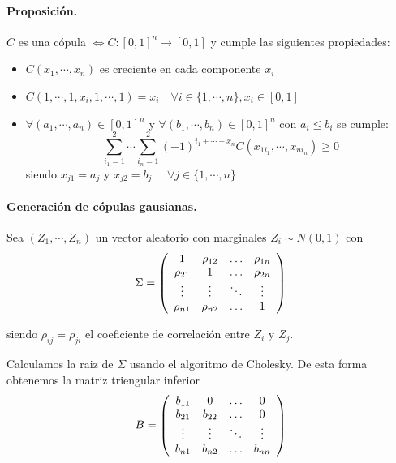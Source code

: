 \paragraph{Proposici\'on.}
$C$ es una c\'opula $\iff C:[0,1]^n \to [0,1]$ y cumple las siguientes 
propiedades:
\begin{itemize}
\item $C(x_1, \cdots, x_n)$ es creciente en cada componente $x_i$
\item $C(1, \cdots, 1, x_i, 1, \cdots, 1) = x_i \quad \forall i \in \{1, \cdots, n\}, x_i \in [0,1]$
\item $\forall (a_1, \cdots, a_n) \in [0,1]^n$ y $\forall (b_1, \cdots, b_n) \in [0,1]^n$ con
$a_i \leq b_i$ se cumple:
\begin{displaymath}
\sum_{i_1=1}^{2} \cdots \sum_{i_n=1}^{2} (-1)^{i_1+\cdots+x_n} C(x_{1i_1},\cdots,x_{ni_n}) \geq 0
\end{displaymath}
\noindent siendo $x_{j1}=a_j$ y $x_{j2}=b_j$ $\quad \forall j \in \{1, \cdots, n\}$
\end{itemize}

\paragraph{Generaci\'on de c\'opulas gausianas.}

Sea $(Z_1,\cdots, Z_n)$ un vector aleatorio con marginales $Z_i \sim N(0,1)$ con
\begin{displaymath}
\Sigma = \left( 
\begin{array}{cccc}
1          & \rho_{12} & \ldots & \rho_{1n} \cr
\rho_{21} & 1          & \ldots & \rho_{2n} \cr
\vdots    & \vdots    & \ddots & \vdots   \cr
\rho_{n1} & \rho_{n2} & \ldots & 1
\end{array}
\right)
\end{displaymath}

\noindent siendo $\rho_{ij} = \rho_{ji}$ el coeficiente de correlaci\'on entre 
$Z_i$ y $Z_j$.

\noindent Calculamos la raiz de $\Sigma$ usando el algoritmo de Cholesky. 
De esta forma obtenemos la matriz triengular inferior
\begin{displaymath}
B = 
\left(
\begin{array}{cccc}
b_{11}   & 0        & \ldots & 0       \cr
b_{21}   & b_{22}   & \ldots & 0       \cr
\vdots  & \vdots  & \ddots & \vdots \cr
b_{n1}   & b_{n2}   & \ldots & b_{nn}
\end{array}
\right)
\end{displaymath}

